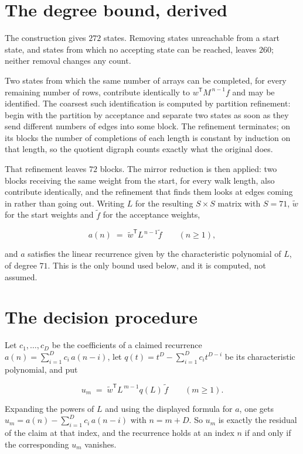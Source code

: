 \documentclass[11pt]{article}
\theoremstyle{definition}
\begin{document}
\section{The degree bound, derived}

The construction gives $272$ states. Removing states unreachable from a start state, and states from which no accepting state can be reached, leaves $260$; neither removal changes any count.

Two states from which the same number of arrays can be completed, for every remaining number of rows, contribute identically to $w^{\mathsf T}M^{\,n-1}f$ and may be identified. The coarsest such identification is computed by partition refinement: begin with the partition by acceptance and separate two states as soon as they send different numbers of edges into some block. The refinement terminates; on its blocks the number of completions of each length is constant by induction on that length, so the quotient digraph counts exactly what the original does.

That refinement leaves $72$ blocks. The mirror reduction is then applied: two blocks receiving the same weight from the start, for every walk length, also contribute identically, and the refinement that finds them looks at edges coming in rather than going out. Writing $L$ for the resulting $S \times S$ matrix with $S = 71$, $\tilde w$ for the start weights and $\tilde f$ for the acceptance weights,

\[a(n) \;=\; \tilde w^{\mathsf T} L^{\,n-1} \tilde f \qquad (n \ge 1),\]

and $a$ satisfies the linear recurrence given by the characteristic polynomial of $L$, of degree $71$. This is the only bound used below, and it is computed, not assumed.

\section{The decision procedure}

Let $c_1,\dots,c_D$ be the coefficients of a claimed recurrence $a(n) = \sum_{i=1}^{D} c_i\,a(n-i)$, let $q(t) = t^{D} - \sum_{i=1}^{D} c_i t^{D-i}$ be its characteristic polynomial, and put

\[u_m \;=\; \tilde w^{\mathsf T} L^{\,m-1} q(L)\,\tilde f \qquad (m \ge 1).\]

Expanding the powers of $L$ and using the displayed formula for $a$, one gets $u_m = a(n) - \sum_{i=1}^{D} c_i\,a(n-i)$ with $n = m + D$. So $u_m$ is exactly the residual of the claim at that index, and the recurrence holds at an index $n$ if and only if the corresponding $u_m$ vanishes.
\end{document}
